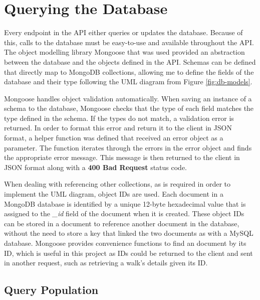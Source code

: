 \section{Querying the Database}

Every endpoint in the API either queries or updates the database. Because of this, calls to the database must be easy-to-use and available throughout the API. The object modelling library Mongoose that was used provided an abstraction between the database and the objects defined in the API. Schemas can be defined that directly map to MongoDB collections, allowing me to define the fields of the database and their type following the UML diagram from Figure \ref{fig:db-models}.

Mongoose handles object validation automatically. When saving an instance of a schema to the database, Mongoose checks that the type of each field matches the type defined in the schema. If the types do not match, a validation error is returned. In order to format this error and return it to the client in JSON format, a helper function was defined that received an error object as a parameter. The function iterates through the errors in the error object and finds the appropriate error message. This message is then returned to the client in JSON format along with a \textbf{400 Bad Request} status code.

When dealing with referencing other collections, as is required in order to implement the UML diagram, object IDs are used. Each document in a MongoDB database is identified by a unique 12-byte hexadecimal value that is assigned to the \textit{\_id} field of the document when it is created. These object IDs can be stored in a document to reference another document in the database, without the need to store a key that linked the two documents as with a MySQL database. Mongoose provides convenience functions to find an document by its ID, which is useful in this project as IDs could be returned to the client and sent in another request, such as retrieving a walk's details given its ID.

\subsection{Query Population}

